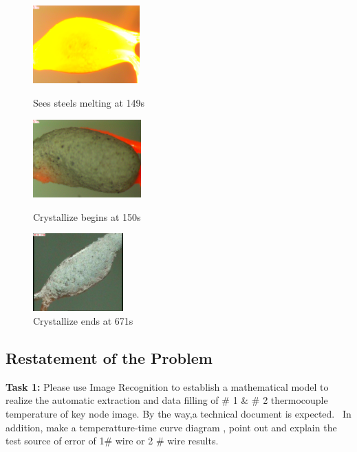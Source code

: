\documentclass{apmcmthesis}
\begin{document}
\begin{figure}[htbp!]
	\begin{minipage}{0.33\linewidth}
		\centering
		\includegraphics[height=3cm]{./figures/1-4.PNG}
		\caption{Sees steels melting at 149s}
		\label{fig:4}
	\end{minipage}
	\begin{minipage}{0.33\linewidth}
		\centering
		\includegraphics[height=3cm]{./figures/1-5.PNG}
		\caption{Crystallize begins at 150s}
		\label{fig:5}
	\end{minipage}
	\begin{minipage}{0.33\linewidth}
	\centering
	\includegraphics[height=3cm]{./figures/1-6.PNG}
	\caption{Crystallize ends at 671s}
	\label{fig:6}
\end{minipage}
\end{figure}
	
\subsection{Restatement of the Problem}
      	
\noindent\textbf{Task 1: } Please use Image Recognition to establish a mathematical model to realize the automatic extraction and data filling of  \# 1 \& \# 2 thermocouple temperature of key node image. By the way,a technical document is expected. \ In addition, make a temperatture-time curve diagram , point out and explain the test source of error of 1\# wire or 2 \# wire results.
\end{document}
